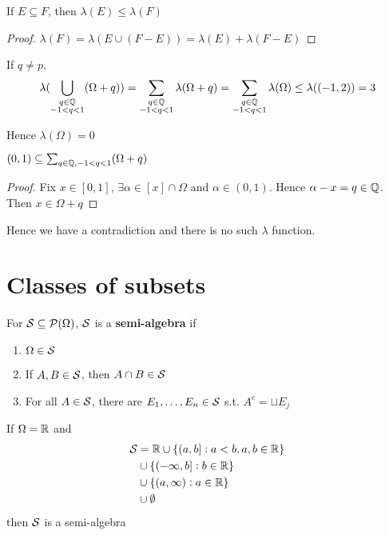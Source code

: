 \documentclass[11pt]{article}
\begin{document}
\begin{claim}
If \(E\subseteq F\), then \(\lambda(E)\le\lambda(F)\)
\end{claim}

\begin{proof}
\(\lambda(F)=\lambda(E\cup(F-E))=\lambda(E)+\lambda(F-E)\)
\end{proof}

If \(q\neq p\),
\begin{equation*}
\lambda(\displaystyle\bigcup_{\substack{q\in\mathbb{Q}\\-1<q<1}}(\Omega+q))
=\displaystyle\sum_{\substack{q\in\mathbb{Q}\\-1<q<1}}\lambda(\Omega+q)
=\displaystyle\sum_{\substack{q\in\mathbb{Q}\\-1<q<1}}\lambda(\Omega)
\le\lambda((-1,2))
=3
\end{equation*}

Hence \(\lambda(\Omega)=0\)

\begin{claim}
\((0,1)\subseteq\sum_{q\in\mathbb{Q},-1<q<1}(\Omega+q)\)
\end{claim}

\begin{proof}
Fix \(x\in[0,1]\), \(\exists\alpha\in[x]\cap\Omega\) and \(\alpha\in(0,1)\). Hence
\(\alpha-x=q\in\mathbb{Q}\). Then \(x\in\Omega+q\)
\end{proof}

Hence we have a contradiction and there is no such \(\lambda\) function.

\section{Classes of subsets}
\label{sec:orgcdbe658}
\begin{definition}[]
For \(\mathcal{S}\subseteq\mathcal{P}(\Omega)\), \(\mathcal{S}\) is a \textbf{semi-algebra} if
\begin{enumerate}
\item \(\Omega\in\mathcal{S}\)
\item If \(A,B\in\mathcal{S}\), then \(A\cap B\in\mathcal{S}\)
\item For all \(A\in\mathcal{S}\), there are \(E_1,\dots,E_n\in\mathcal{S}\) s.t. \(A^c=\sqcup E_j\)
\end{enumerate}
\end{definition}

\begin{examplle}[]
If \(\Omega=\mathbb{R}\) and 
\begin{align*}
\mathcal{S}&=\mathbb{R}\cup\{(a,b]:a<b,a,b\in\mathbb{R}\}\\
&\cup\{(-\infty,b]:b\in\mathbb{R}\}\\
&\cup\{(a,\infty):a\in\mathbb{R}\}\\
&\cup\emptyset
\end{align*}
then \(\mathcal{S}\) is a semi-algebra
\end{examplle}
\end{document}
